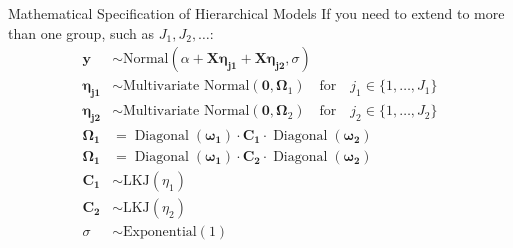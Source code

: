 \begin{frame}{Mathematical Specification of Hierarchical Models}
	If you need to extend to more than one group,
	such as $J_1, J_2, \dots$:
	$$
		\begin{aligned}
			\mathbf{y}             & \sim \text{Normal}(\alpha + \mathbf{X} \boldsymbol{\eta_{j1}} + \mathbf{X} \boldsymbol{\eta_{j2}}, \sigma)               \\
			\boldsymbol{\eta_{j1}} & \sim \text{Multivariate Normal}(\mathbf{0}, \boldsymbol{\Omega}_1)
			\quad \text{for}\quad j_1 \in \{ 1, \dots, J_1 \}                                                                                                 \\
			\boldsymbol{\eta_{j2}} & \sim \text{Multivariate Normal}(\mathbf{0}, \boldsymbol{\Omega}_2)
			\quad \text{for}\quad j_2 \in \{ 1, \dots, J_2 \}                                                                                                 \\
			\boldsymbol{\Omega_1}  & = \operatorname{Diagonal}(\boldsymbol{\omega_1}) \cdot \mathbf{C_1} \cdot \operatorname{Diagonal}(\boldsymbol{\omega_2}) \\
			\boldsymbol{\Omega_1}  & = \operatorname{Diagonal}(\boldsymbol{\omega_1}) \cdot \mathbf{C_2} \cdot \operatorname{Diagonal}(\boldsymbol{\omega_2}) \\
			\mathbf{C_1}           & \sim \text{LKJ}(\eta_1)                                                                                                  \\
			\mathbf{C_2}           & \sim \text{LKJ}(\eta_2)                                                                                                  \\
			\sigma                 & \sim \text{Exponential}(1)
		\end{aligned}
	$$
\end{frame}
